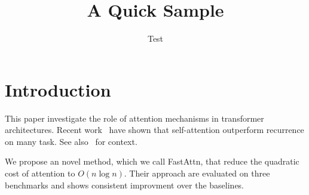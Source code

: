 \documentclass{article}
\title{A Quick Sample}
\author{Test}
\begin{document}
\maketitle

\section{Introduction}
This paper investigate the role of attention mechanisms in transformer
architectures. Recent work~\cite{vaswani2017} have shown that self-attention
outperform recurrence on many task. See also~\cite{nonexistent2024} for
context.

We propose an novel method, which we call FastAttn, that reduce the quadratic
cost of attention to $O(n \log n)$. Their approach are evaluated on three
benchmarks and shows consistent improvment over the baselines.



\end{document}
